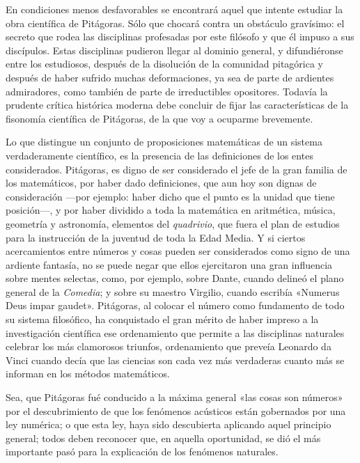 \documentclass[a4paper, 12pt, draft]{article}
\begin{document}
{En condiciones menos desfavorables se encontrará aquel que intente estudiar la obra científica de Pitágoras. Sólo que chocará contra un obstáculo gravísimo: el secreto que rodea las disciplinas profesadas por este filósofo y que él impuso a sus discípulos. Estas disciplinas pudieron llegar al dominio general, y difundiéronse entre los estudiosos, después de la disolución de la comunidad pitagórica y después de haber sufrido muchas deformaciones, ya sea de parte de ardientes admiradores, como también de parte de irreductibles opositores. Todavía la prudente crítica histórica moderna debe concluir de fijar las características de la fisonomía científica de Pitágoras, de la que voy a ocuparme brevemente.

Lo que distingue un conjunto de proposiciones matemáticas de un sistema verdaderamente científico, es la presencia de las definiciones de los entes considerados. Pitágoras, es digno de ser considerado el jefe de la gran familia de los matemáticos, por haber dado definiciones, que aun hoy son dignas de consideración ---por ejemplo: haber dicho que el punto es la unidad que tiene posición---, y por haber dividido a toda la matemática en aritmética, música, geometría y astronomía, elementos del \textit{ quadrivio}, que fuera el plan de estudios para la instrucción de la juventud de toda la Edad Media. Y si ciertos acercamientos entre números y cosas pueden ser considerados como signo de una ardiente fantasía, no se puede negar que ellos ejercitaron una
gran influencia sobre mentes selectas, como, por
ejemplo, sobre Dante, cuando delineó el plano general de la \textit{ Comedia}; y sobre su maestro Virgilio,
cuando escribía «Numerus Deus impar gaudet». Pitágoras, al colocar el número como fundamento de
todo su sistema filosófico, ha conquistado el gran
mérito de haber impreso a la investigación científica
ese ordenamiento que permite a las disciplinas naturales celebrar los más clamorosos triunfos, ordenamiento que preveía Leonardo da Vinci cuando decía que las ciencias son cada vez más verdaderas
cuanto más se informan en los métodos matemáticos.

Sea, que Pitágoras fué conducido a la máxima general «las cosas son números» por el descubrimiento de que los fenómenos acústicos están gobernados por una ley numérica; o que esta ley, haya sido descubierta aplicando aquel principio general; todos deben reconocer que, en aquella oportunidad, se dió el más importante pasó para la explicación de los fenómenos naturales.

}
\end{document}
